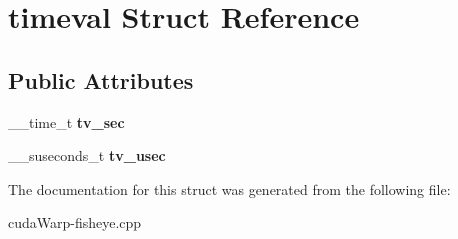 \hypertarget{structtimeval}{}\section{timeval Struct Reference}
\label{structtimeval}
\subsection*{Public Attributes}
\begin{DoxyCompactItemize}
\item 
\+\_\+\+\_\+time\+\_\+t {\bfseries tv\+\_\+sec}\hypertarget{structtimeval_a33c19839180ed049b0419f680f5c37ad}{}\label{structtimeval_a33c19839180ed049b0419f680f5c37ad}

\item 
\+\_\+\+\_\+suseconds\+\_\+t {\bfseries tv\+\_\+usec}\hypertarget{structtimeval_a6792d43e50db57fb38f7b31d48d105ad}{}\label{structtimeval_a6792d43e50db57fb38f7b31d48d105ad}

\end{DoxyCompactItemize}


The documentation for this struct was generated from the following file\+:\begin{DoxyCompactItemize}
\item 
cuda\+Warp-\/fisheye.\+cpp\end{DoxyCompactItemize}
